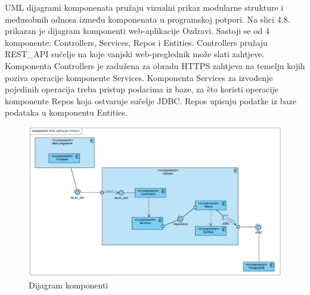 		
		
		UML dijagrami komponenata pružaju vizualni prikaz modularne strukture i međusobnih odnosa između komponenata u programskoj potpori. Na slici 4.8. prikazan je dijagram komponenti web-aplikacije Ozdravi. Sastoji se od 4 komponente: Controllers, Services, Repos i Entities. Controllers pružaju REST\_API sučelje na koje vanjski web-preglednik može slati zahtjeve. Komponenta Controllers je zadužena za obradu HTTPS zahtjeva na temelju kojih poziva operacije komponente Services. Komponenta Services za izvođenje pojedinih operacija treba pristup podacima iz baze, za što koristi operacije komponente Repos koja ostvaruje sučelje JDBC. Repos upisuju podatke iz baze podataka u komponentu Entities.
		
			 \begin{figure}[H]
				\includegraphics[width=\textwidth]{slike/DijagramKomponenti.png} 
				\caption{Dijagram komponenti} 
		    \end{figure}
			\eject